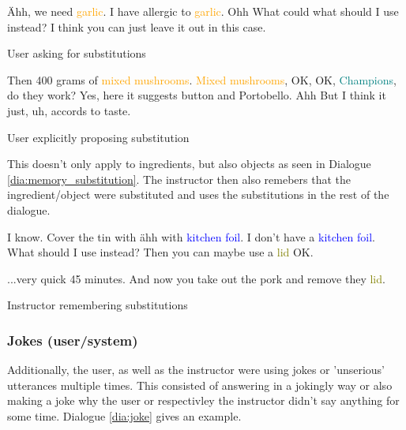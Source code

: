 \documentclass[
	11pt, %
]{fphw}
\newenvironment{captionedDialogue}
    {\captionsetup{
        type=Dialogue,
        skip=2pt,
        belowskip=13pt
        }
    }
    {}
\newenvironment{mydialogue}
    {\begin{snugshade}
     \hrulefill
     \begin{dialogue}}
    {\end{dialogue}
     \hrulefill
     \end{snugshade}}
\begin{document}
\begin{captionedDialogue}
    \begin{mydialogue}
         Ähh, we need \textcolor{orange}{garlic}. 
         I have allergic to \textcolor{orange}{garlic}.
         Ohh 
         What could what should I use instead? 
         I think you can just leave it out in this case.
    \end{mydialogue}
    \caption{User asking for substitutions}
    \label{dia:impl_substitution}
\end{captionedDialogue}

\begin{captionedDialogue}
    \begin{mydialogue}
         Then 400 grams of \textcolor{orange}{mixed mushrooms}. 
         \textcolor{orange}{Mixed mushrooms}, OK, OK, \textcolor{teal}{Champions}, do they work? 
         Yes, here it suggests button and Portobello. 
         Ahh 
         But I think it just, uh, accords to taste.
    \end{mydialogue}
    \caption{User explicitly proposing substitution}
    \label{dia:expl_substitution}
\end{captionedDialogue}

This doesn't only apply to ingredients, but also objects as seen in Dialogue \ref{dia:memory_substitution}. The instructor then also remebers that the ingredient/object were substituted and uses the substitutions in the rest of the dialogue.

\begin{captionedDialogue}
    \begin{mydialogue}
         I know. Cover the tin with ähh with \textcolor{blue}{kitchen foil}. 
         I don't have a \textcolor{blue}{kitchen foil}. What should I use instead? 
         Then you can maybe use a \textcolor{olive}{lid}
         OK.
        
        \medskip
        \direct{\dots}
        \medskip

         ...very quick 45 minutes. And now you take out the pork and remove they \textcolor{olive}{lid}. 
    \end{mydialogue}
    \caption{Instructor remembering substitutions}
    \label{dia:memory_substitution}
\end{captionedDialogue}

\subsubsection*{Jokes (user/system)}
Additionally, the user, as well as the instructor were using jokes or 'unserious' utterances multiple times. This consisted of answering in a jokingly way or also making a joke why the user or respectivley the instructor didn't say anything for some time. Dialogue \ref{dia:joke} gives an example.
\end{document}
